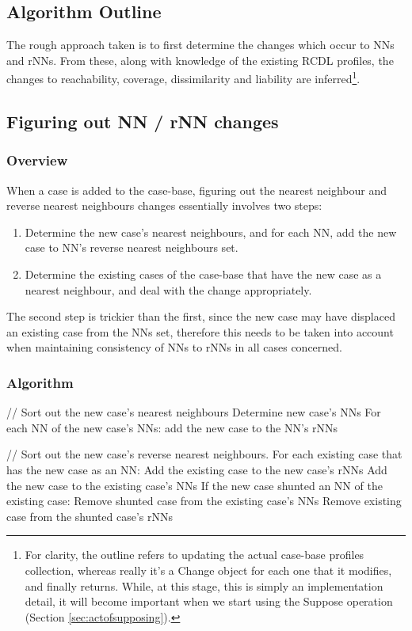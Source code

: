 \documentclass[a4paper,11pt]{report}
\begin{document}
\subsection{Algorithm Outline}
The rough approach taken is to first determine the changes which occur to NNs and rNNs. From these, along with knowledge of the existing RCDL profiles, the changes to reachability, coverage, dissimilarity and liability are inferred\footnote{For clarity, the outline refers to updating the actual case-base profiles collection, whereas really it's a Change object for each one that it modifies, and finally returns. While, at this stage, this is simply an implementation detail, it will become important when we start using the Suppose operation (Section \ref{sec:actofsupposing}).}.

\subsection{Figuring out NN / rNN changes}
\subsubsection{Overview}
When a case is added to the case-base, figuring out the nearest neighbour and reverse nearest neighbours changes essentially involves two steps:
\begin{enumerate}
	\item Determine the new case's nearest neighbours, and for each NN, add the new case to NN's reverse nearest neighbours set.
	\item Determine the existing cases of the case-base that have the new case as a nearest neighbour, and deal with the change appropriately.
\end{enumerate}

The second step is trickier than the first, since the new case may have displaced an existing case from the NNs set, therefore this needs to be taken into account when maintaining consistency of NNs to rNNs in all cases concerned.

\subsubsection{Algorithm\label{sec:nnchangesalg}}
\begin{code}
// Sort out the new case's nearest neighbours
Determine new case's NNs
For each NN of the new case's NNs:
  add the new case to the NN's rNNs

// Sort out the new case's reverse nearest neighbours.
For each existing case that has the new case as an NN:
  Add the existing case to the new case's rNNs
  Add the new case to the existing case's NNs
  If the new case shunted an NN of the existing case:
    Remove shunted case from the existing case's NNs
    Remove existing case from the shunted case's rNNs
\end{code}
\end{document}
